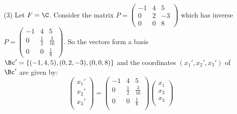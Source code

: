 \begin{example}
\begin{enumerate}
            \item[(3)] Let $F=\C$. Consider the matrix  $P=\begin{pmatrix}
                                                            -1 & 4 & 5 \\
                                                             0 & 2 & -3 \\
                                                             0 & 0 & 8
                                                       \end{pmatrix}$
            which has inverse $P=\begin{pmatrix}
                                    -1 & 4 & 5 \\
                                     0 & \frac{1}{2} & \frac{3}{16} \\
                                     0 & 0 & \frac{1}{8}
                                 \end{pmatrix}$. So the vectors form a basis $\Bc'=\{(-1, 4, 5), (0,
                                 2, -3), (0, 0, 8)\}$ and the coordinates  $(x_1', x_2', x_3')$ of
                                 $\Bc'$ are given by:
            \begin{equation*}
                \begin{pmatrix}
                    x_1' \\
                    x_2' \\
                    x_3' \\
                \end{pmatrix}=
                \begin{pmatrix}
                    -1 & 4 & 5 \\
                     0 & \frac{1}{2} & \frac{3}{16} \\
                     0 & 0 & \frac{1}{8} \\
                \end{pmatrix}
                \begin{pmatrix}
                    x_1 \\
                    x_2 \\
                    x_3 \\
                \end{pmatrix}
            \end{equation*}
    \end{enumerate}
\end{example} 
